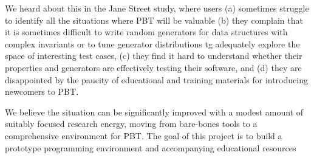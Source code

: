 
We heard about this in the Jane Street study, where users
(a) sometimes struggle to identify all the
situations where PBT will be valuable
(b) they complain that it
is sometimes difficult to write random generators for data structures
with complex invariants or to tune generator distributions tg
adequately explore the space of interesting test cases, (c) they find
it hard to understand whether their properties and generators are
effectively testing their software, and (d) they are disappointed by
the paucity of educational and training materials for introducing
newcomers to PBT.  \iflater{}\fi

We believe the situation can be significantly improved with a modest
amount of suitably focused research energy, moving from bare-bones
tools to a comprehensive environment for PBT.  The goal of this
project is to build a prototype programming environment and
accompanying educational resources
%

